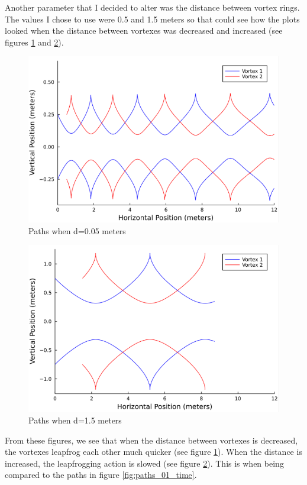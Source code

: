 \documentclass{article}
\begin{document}
Another parameter that I decided to alter was the distance between vortex rings. The values I chose to use were 0.5 and 1.5 meters so that could see how the plots looked when the distance between vortexes was decreased and increased (see figures \ref{fig:paths_.05_distance} and \ref{fig:paths_1.5_distance}).

\begin{figure}[ht]
\centering
\includegraphics[scale=0.75]{graphics/plots_.05.1.4000.01.png}
\caption{Paths when d=0.05 meters}
\label{fig:paths_.05_distance}
\end{figure}

\begin{figure}[ht]
\centering
\includegraphics[scale=0.75]{graphics/plots_1.5.1.4000.01.png}
\caption{Paths when d=1.5 meters}
\label{fig:paths_1.5_distance}
\end{figure}

From these figures, we see that when the distance between vortexes is decreased, the vortexes leapfrog each other much quicker (see figure \ref{fig:paths_.05_distance}). When the distance is increased, the leapfrogging action is slowed (see figure \ref{fig:paths_1.5_distance}). This is when being compared to the paths in figure \ref{fig:paths_01_time}.
\end{document}
